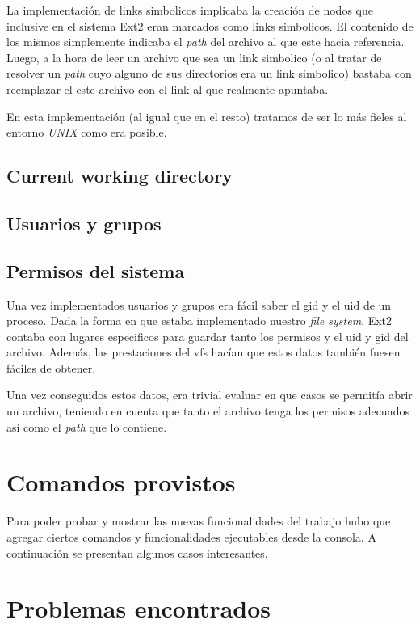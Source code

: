 \documentclass[a4paper,10pt]{article}
\begin{document}
    La implementación de links simbolicos implicaba la creación de nodos que inclusive en el sistema Ext2 eran marcados
    como links simbolicos. El contenido de los mismos simplemente indicaba el \textit{path} del archivo al que este
    hacia referencia.
    Luego, a la hora de leer un archivo que sea un link simbolico (o al tratar de resolver un \textit{path} cuyo alguno
    de sus directorios era un link simbolico) bastaba con reemplazar el este archivo con el link al que realmente
    apuntaba.

    En esta implementación (al igual que en el resto) tratamos de ser lo más fieles al entorno \textit{UNIX} como 
    era posible.

    \subsection{Current working directory}

    \subsection{Usuarios y grupos}
    
    \subsection{Permisos del sistema}

    Una vez implementados usuarios y grupos era fácil saber el gid y el uid de un proceso. Dada la forma en que estaba
    implementado nuestro \textit{file system}, Ext2 contaba con lugares especificos para guardar tanto los permisos y el
    uid y gid del archivo. Además, las prestaciones del vfs hacían que estos datos también fuesen fáciles de obtener.

    Una vez conseguidos estos datos, era trivial evaluar en que casos se permitía abrir un archivo, teniendo en cuenta
    que tanto el archivo tenga los permisos adecuados así como el \textit{path} que lo contiene.

\newpage
\section{Comandos provistos}
    Para poder probar y mostrar las nuevas funcionalidades del trabajo hubo que agregar ciertos comandos y
    funcionalidades ejecutables desde la consola. A continuación se presentan algunos casos interesantes.

\newpage
\section{Problemas encontrados}
\end{document}
